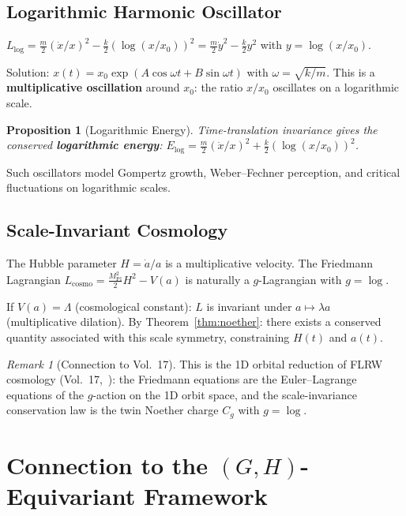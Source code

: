 \documentclass[11pt,twocolumn]{article}
\theoremstyle{plain}
\newtheorem{proposition}[theorem]{Proposition}
\theoremstyle{definition}
\theoremstyle{remark}
\newtheorem{remark}[theorem]{Remark}
\begin{document}
\subsection{Logarithmic Harmonic Oscillator}

$L_{\log} = \frac{m}{2}(\dot{x}/x)^2 - \frac{k}{2}(\log(x/x_0))^2 = \frac{m}{2}\dot{y}^2 - \frac{k}{2}y^2$ with $y = \log(x/x_0)$.

Solution: $x(t) = x_0\exp(A\cos\omega t + B\sin\omega t)$ with $\omega = \sqrt{k/m}$. This is a \textbf{multiplicative oscillation} around $x_0$: the ratio $x/x_0$ oscillates on a logarithmic scale.

\begin{proposition}[Logarithmic Energy]
Time-translation invariance gives the conserved \textbf{logarithmic energy}:
$E_{\log} = \frac{m}{2}(\dot{x}/x)^2 + \frac{k}{2}(\log(x/x_0))^2$.
\end{proposition}

Such oscillators model Gompertz growth, Weber--Fechner perception, and critical fluctuations on logarithmic scales.

\subsection{Scale-Invariant Cosmology}

The Hubble parameter $H = \dot{a}/a$ is a multiplicative velocity. The Friedmann Lagrangian $L_{\mathrm{cosmo}} = \frac{M_{\mathrm{Pl}}^2}{2}H^2 - V(a)$ is naturally a $g$-Lagrangian with $g = \log$.

If $V(a) = \Lambda$ (cosmological constant): $L$ is invariant under $a \mapsto \lambda a$ (multiplicative dilation). By Theorem~\ref{thm:noether}: there exists a conserved quantity associated with this scale symmetry, constraining $H(t)$ and $a(t)$.

\begin{remark}[Connection to Vol.~17]
This is the 1D orbital reduction of FLRW cosmology (Vol.~17,~\cite{nembe2026vol17}): the Friedmann equations are the Euler--Lagrange equations of the $g$-action on the 1D orbit space, and the scale-invariance conservation law is the twin Noether charge $C_g$ with $g = \log$.
\end{remark}


\section{Connection to the $(G,H)$-Equivariant Framework}
\label{sec:connection}
\end{document}
